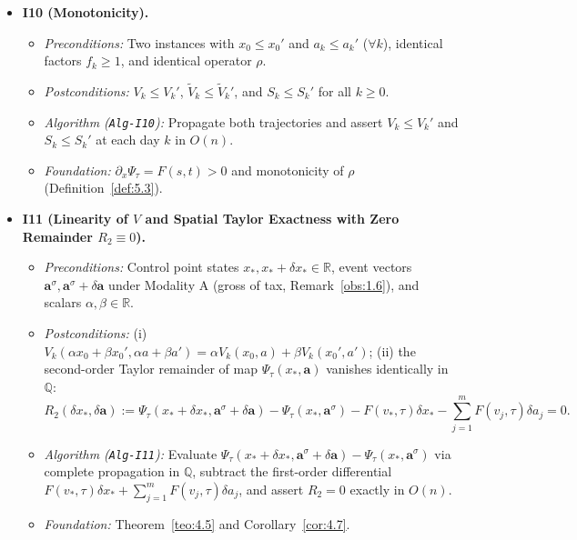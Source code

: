 \documentclass[11pt, a4paper]{article}
\theoremstyle{definition}
\theoremstyle{plain}
\theoremstyle{remark}
\begin{document}
\begin{itemize}
    \item \textbf{I10 (Monotonicity).}
    \begin{itemize}
        \item \emph{Preconditions:} Two instances with $x_0 \le x_0'$ and $a_k \le a_k'$ ($\forall k$), identical factors $f_k \ge 1$, and identical operator $\rho$.
        \item \emph{Postconditions:} $V_k \le V_k'$, $\tilde{V}_k \le \tilde{V}_k'$, and $S_k \le S_k'$ for all $k \ge 0$.
        \item \emph{Algorithm (\texttt{Alg-I10}):} Propagate both trajectories and assert $V_k \le V_k'$ and $S_k \le S_k'$ at each day $k$ in $O(n)$.
        \item \emph{Foundation:} $\partial_x \Psi_\tau = F(s,t) > 0$ and monotonicity of $\rho$ (Definition~\ref{def:5.3}).
    \end{itemize}

    \item \textbf{I11 (Linearity of $V$ and Spatial Taylor Exactness with Zero Remainder \texorpdfstring{$R_2 \equiv 0$}{R2 = 0}).}
    \begin{itemize}
        \item \emph{Preconditions:} Control point states $x_*, x_* + \delta x_* \in \mathbb{R}$, event vectors $\mathbf{a}^\sigma, \mathbf{a}^\sigma + \delta\mathbf{a}$ under Modality A (gross of tax, Remark~\ref{obs:1.6}), and scalars $\alpha, \beta \in \mathbb{R}$.
        \item \emph{Postconditions:} (i) $V_k(\alpha x_0 + \beta x_0', \alpha a + \beta a') = \alpha V_k(x_0, a) + \beta V_k(x_0', a')$; (ii) the second-order Taylor remainder of map $\Psi_\tau(x_*, \mathbf{a})$ vanishes identically in $\mathbb{Q}$:
        \[
        R_2(\delta x_*, \delta\mathbf{a}) := \Psi_\tau(x_* + \delta x_*, \mathbf{a}^\sigma + \delta\mathbf{a}) - \Psi_\tau(x_*, \mathbf{a}^\sigma) - F(v_*, \tau)\delta x_* - \sum_{j=1}^m F(v_j, \tau)\delta a_j = 0.
        \]
        \item \emph{Algorithm (\texttt{Alg-I11}):} Evaluate $\Psi_\tau(x_* + \delta x_*, \mathbf{a}^\sigma + \delta\mathbf{a}) - \Psi_\tau(x_*, \mathbf{a}^\sigma)$ via complete propagation in $\mathbb{Q}$, subtract the first-order differential $F(v_*, \tau)\delta x_* + \sum_{j=1}^m F(v_j, \tau)\delta a_j$, and assert $R_2 = 0$ exactly in $O(n)$.
        \item \emph{Foundation:} Theorem~\ref{teo:4.5} and Corollary~\ref{cor:4.7}.
    \end{itemize}
\end{itemize}
\end{document}
